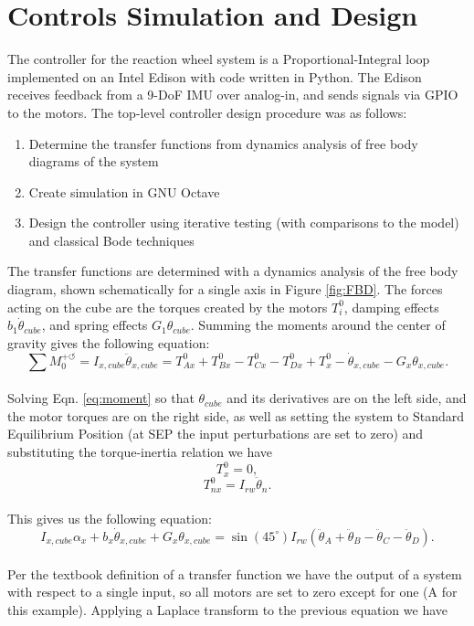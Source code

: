 \documentclass[]{aiaa-tc}%
\begin{document}
\section{Controls Simulation and Design}
The controller for the reaction wheel system is a Proportional-Integral loop implemented on an Intel Edison with code written in Python. The Edison receives feedback from a 9-DoF IMU over analog-in, and sends signals via GPIO to the motors. The top-level controller design procedure was as follows:
\begin{enumerate}
\item Determine the transfer functions from dynamics analysis of free body diagrams of the system
\item Create simulation in GNU Octave
\item Design the controller using iterative testing (with comparisons to the model) and classical Bode techniques
\end{enumerate}
The transfer functions are determined with a dynamics analysis of the free body diagram, shown schematically for a single axis in Figure \ref{fig:FBD}. The forces acting on the cube are the torques created by the motors $T_i^0$, damping effects $b_1 \dot{\theta}_{cube}$, and spring effects $G_1 \theta_{cube}$. Summing the moments around the center of gravity gives the following equation:\\

\begin{equation}
\label{eq:moment}
\sum M_0^{+ \circlearrowleft} = I_{x,cube} \ddot{\theta}_{x,cube} = T^0_{Ax} + T^0_{Bx} - T^0_{Cx} - T^0_{Dx} + T^0_x - \dot{\theta}_{x,cube} - G_x \theta_{x,cube}.
\end{equation}\\
	
Solving Eqn. \ref{eq:moment} so that $\theta_{cube}$ and its derivatives are on the left side, and the motor torques are on the right side, as well as setting the system to Standard Equilibrium Position (at SEP the input perturbations are set to zero) and substituting the torque-inertia relation we have\\

\[
T^0_x = 0,
\]
\[
T^0_{nx} = I_{rw}\ddot{\theta}_n.\]\\

This gives us the following equation:\\
 
\[
I_{x,cube} \alpha_x + b_x \dot{\theta}_{x,cube} + G_x \theta_{x,cube} = \sin(45^{\circ}) I_{rw} (\ddot{\theta}_A + \ddot{\theta}_B -\ddot{\theta}_C - \ddot{\theta}_D).
\]\\	
Per the textbook definition of a transfer function we have the output of a system with respect to a single input, so all motors are set to zero except for one (A for this example). Applying a Laplace transform to the previous equation we have\\
\end{document}
